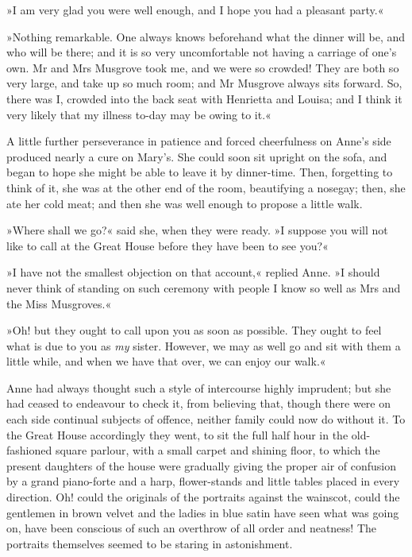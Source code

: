 »I am very glad you were well enough, and I hope you had a pleasant party.«

»Nothing remarkable. One always knows beforehand what the dinner will be, and who will be there; and it is so very uncomfortable not having a carriage of one's own. Mr and Mrs Musgrove took me, and we were so crowded! They are both so very large, and take up so much room; and Mr Musgrove always sits forward. So, there was I, crowded into the back seat with Henrietta and Louisa; and I think it very likely that my illness to-day may be owing to it.«

A little further perseverance in patience and forced cheerfulness on Anne's side produced nearly a cure on Mary's. She could soon sit upright on the sofa, and began to hope she might be able to leave it by dinner-time. Then, forgetting to think of it, she was at the other end of the room, beautifying a nosegay; then, she ate her cold meat; and then she was well enough to propose a little walk.

»Where shall we go?« said she, when they were ready. »I suppose you will not like to call at the Great House before they have been to see you?«

»I have not the smallest objection on that account,« replied Anne. »I should never think of standing on such ceremony with people I know so well as Mrs and the Miss Musgroves.«

»Oh! but they ought to call upon you as soon as possible. They ought to feel what is due to you as \textit{my} sister. However, we may as well go and sit with them a little while, and when we have that over, we can enjoy our walk.«

Anne had always thought such a style of intercourse highly imprudent; but she had ceased to endeavour to check it, from believing that, though there were on each side continual subjects of offence, neither family could now do without it. To the Great House accordingly they went, to sit the full half hour in the old-fashioned square parlour, with a small carpet and shining floor, to which the present daughters of the house were gradually giving the proper air of confusion by a grand piano-forte and a harp, flower-stands and little tables placed in every direction. Oh! could the originals of the portraits against the wainscot, could the gentlemen in brown velvet and the ladies in blue satin have seen what was going on, have been conscious of such an overthrow of all order and neatness! The portraits themselves seemed to be staring in astonishment.

